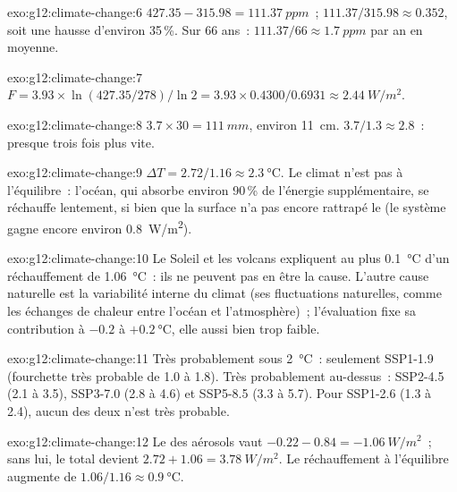 \begin{solution}{exo:g12:climate-change:6}
$427.35 - 315.98 = \qty{111.37}{ppm}$~; $111.37/315.98 \approx 0.352$, soit
une hausse d'environ 35\,\%. Sur 66 ans~: $111.37/66 \approx
\qty{1.7}{ppm}$ par an en moyenne.
\end{solution}

\begin{solution}{exo:g12:climate-change:7}
$F = 3.93 \times \ln(427.35/278)/\ln 2 = 3.93 \times 0.4300/0.6931 \approx
\qty{2.44}{W/m^2}$.
\end{solution}

\begin{solution}{exo:g12:climate-change:8}
$3.7 \times 30 = \qty{111}{mm}$, environ \qty{11}{cm}. $3.7/1.3 \approx 2.8$~:
presque trois fois plus vite.
\end{solution}

\begin{solution}{exo:g12:climate-change:9}
$\Delta T = 2.72/1.16 \approx \qty{2.3}{\degreeCelsius}$. Le climat n'est
pas à l'équilibre~: l'océan, qui absorbe environ 90\,\% de l'énergie
supplémentaire, se réchauffe lentement, si bien que la surface n'a pas
encore rattrapé le  (le système gagne encore environ
\qty{0.8}{W/m^2}).
\end{solution}

\begin{solution}{exo:g12:climate-change:10}
Le Soleil et les volcans expliquent au plus \qty{0.1}{\degreeCelsius} d'un
réchauffement de \qty{1.06}{\degreeCelsius}~: ils ne peuvent pas en être la
cause. L'autre cause naturelle est la variabilité interne du climat (ses
fluctuations naturelles, comme les échanges de chaleur entre l'océan et
l'atmosphère)~; l'évaluation fixe sa contribution à $-0.2$ à $+\qty{0.2}{\degreeCelsius}$,
elle aussi bien trop faible.
\end{solution}

\begin{solution}{exo:g12:climate-change:11}
Très probablement sous \qty{2}{\degreeCelsius}~: seulement SSP1-1.9
(fourchette très probable de 1.0 à 1.8). Très probablement au-dessus~:
SSP2-4.5 (2.1 à 3.5), SSP3-7.0 (2.8 à 4.6) et SSP5-8.5 (3.3 à 5.7). Pour
SSP1-2.6 (1.3 à 2.4), aucun des deux n'est très probable.
\end{solution}

\begin{solution}{exo:g12:climate-change:12}
Le  des aérosols vaut $-0.22 - 0.84 = \qty{-1.06}{W/m^2}$~; sans lui,
le total devient $2.72 + 1.06 = \qty{3.78}{W/m^2}$. Le réchauffement à
l'équilibre augmente de $1.06/1.16 \approx \qty{0.9}{\degreeCelsius}$.
\end{solution}

